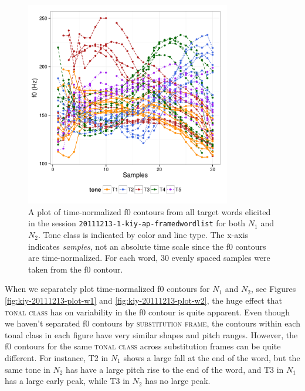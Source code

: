 \documentclass[12pt]{article}
\begin{document}
\begin{figure}
  \centering
  \includegraphics[width=0.8\textwidth]{kiy-20111213-plot-all-by-tone}
  \caption{A plot of time-normalized f0 contours from all target words elicited in the session
    \texttt{20111213-1-kiy-ap-framedwordlist} for both $N_1$ and $N_2$. Tone class is indicated
  by color and line type. The x-axis indicates \textit{samples}, not
  an absolute time scale since the f0 contours are
  time-normalized. For each word, 30 evenly spaced samples were taken
  from the f0 contour. }
  \label{fig:20111213-plot-all-by-tone}
\end{figure}

When we separately plot time-normalized f0 contours for $N_1$ and
$N_2$, see Figures \ref{fig:kiy-20111213-plot-w1} and
\ref{fig:kiy-20111213-plot-w2}, the huge effect that \textsc{tonal class}
has on variability in the f0 contour is quite apparent. Even though we
haven't separated f0 contours by \textsc{substitution frame}, the
contours within each tonal class in each figure have very similar shapes and pitch
ranges. However, the f0 contours for the same \textsc{tonal class}
across substitution frames can be quite different. For instance, T2 in
$N_1$ shows a large fall at the end of the word, but the same tone in
$N_2$ has have a large pitch rise to the end of the word, and T3 in
$N_1$ has a large early peak, while T3 in $N_2$ has no large peak.
\end{document}
